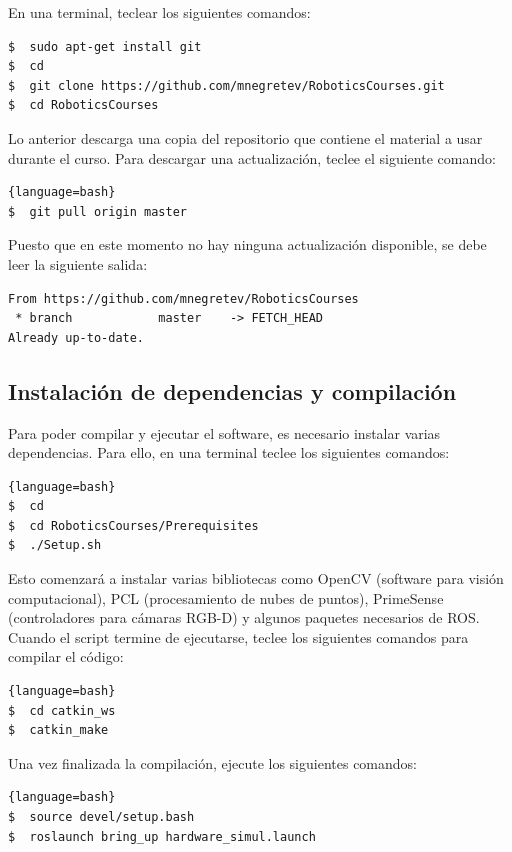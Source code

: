 \documentclass[a4paper,12pt]{article}
\begin{document}
En una terminal, teclear los siguientes comandos:

\begin{lstlisting}[language=bash]
$  sudo apt-get install git
$  cd
$  git clone https://github.com/mnegretev/RoboticsCourses.git
$  cd RoboticsCourses
\end{lstlisting}

Lo anterior descarga una copia del repositorio que contiene el material a usar durante el curso. Para descargar una actualización, teclee el siguiente comando:

\begin{lstlisting}{language=bash}
$  git pull origin master
\end{lstlisting}

Puesto que en este momento no hay ninguna actualización disponible, se debe leer la siguiente salida:

\begin{verbatim}
From https://github.com/mnegretev/RoboticsCourses
 * branch            master    -> FETCH_HEAD
Already up-to-date.
\end{verbatim}

\subsection{Instalación de dependencias y compilación}
Para poder compilar y ejecutar el software, es necesario instalar varias dependencias. Para ello, en una terminal teclee los siguientes comandos:

\begin{lstlisting}{language=bash}
$  cd
$  cd RoboticsCourses/Prerequisites
$  ./Setup.sh
\end{lstlisting}

Esto comenzará a instalar varias bibliotecas como OpenCV (software para visión computacional), PCL (procesamiento de nubes de puntos), PrimeSense (controladores para cámaras RGB-D) y algunos paquetes necesarios de ROS. Cuando el script termine de ejecutarse, teclee los siguientes comandos para compilar el código:

\begin{lstlisting}{language=bash}
$  cd catkin_ws
$  catkin_make
\end{lstlisting}

Una vez finalizada la compilación, ejecute los siguientes comandos:

\begin{lstlisting}{language=bash}
$  source devel/setup.bash
$  roslaunch bring_up hardware_simul.launch
\end{lstlisting}
\end{document}
